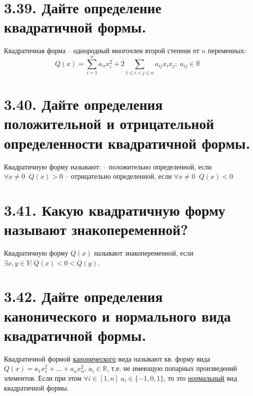 \documentclass{article}
\begin{document}
\section*{\LARGE 3.39. Дайте определение квадратичной формы.}
Квадратичная форма -- однородный многочлен второй степени от $n$ переменных:
$$Q(x) = \sum_{i = 1}^n a_{ii}x_i^2 + 2\sum_{1 \le i < j \le n} a_{ij}x_ix_j; \; a_{ij} \in \mathbb{R}$$

\section*{\LARGE 3.40. Дайте определения положительной и отрицательной определенности квадратичной формы.}
Квадратичную форму называют:
\newline\indent -- положительно определенной, если $\forall x \ne 0 \;\; Q(x) > 0$ 
\newline\indent -- отрицательно определенной, если $\forall x \ne 0 \;\; Q(x) < 0$ 

\section*{\LARGE 3.41. Какую квадратичную форму называют знакопеременной?}
Квадратичную форму $Q(x)$ называют знакопеременной, если 
\newline $\exists x,y \in V : Q(x) < 0 < Q(y)$.

\section*{\LARGE 3.42. Дайте определения канонического и нормального вида квадратичной формы.}
Квадратичной формой \underline{канонического} вида называют кв. форму вида 
\newline $Q(x) = a_1x_1^2 + ... + a_nx_n^2,\, a_i \in \mathbb{R}$, т.е. не имеющую попарных произведений элементов. Если при этом $\forall i \in [1, n] \; a_i \in \{-1, 0, 1\}$, то это \underline{нормальный} вид квадратичной формы.

\end{document}
